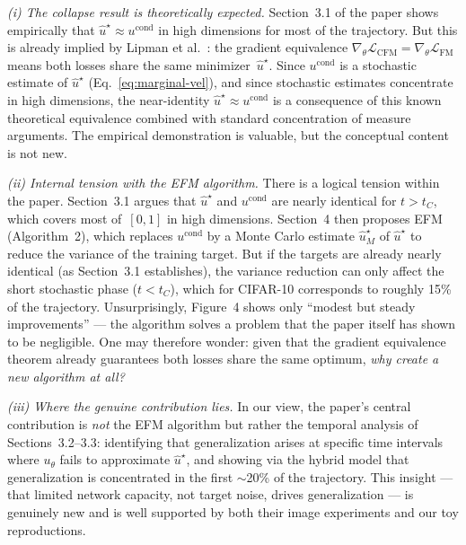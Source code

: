 \documentclass[10pt,a4paper]{article}
\theoremstyle{definition}
\newcommand{\cL}{\mathcal{L}}
\begin{document}
\emph{(i) The collapse result is theoretically expected.}
Section~3.1 of the paper shows empirically that $\hat{u}^\star \approx u^{\mathrm{cond}}$ in high dimensions for most of the trajectory.
But this is already implied by Lipman et al.~\cite[Thm.~2]{lipman2023flow}: the gradient equivalence $\nabla_\theta \cL_{\mathrm{CFM}} = \nabla_\theta \cL_{\mathrm{FM}}$ means both losses share the same minimizer~$\hat{u}^\star$.
Since $u^{\mathrm{cond}}$ is a stochastic estimate of $\hat{u}^\star$ (Eq.~\ref{eq:marginal-vel}), and since stochastic estimates concentrate in high dimensions, the near-identity $\hat{u}^\star \approx u^{\mathrm{cond}}$ is a consequence of this known theoretical equivalence combined with standard concentration of measure arguments.
The empirical demonstration is valuable, but the conceptual content is not new.

\emph{(ii) Internal tension with the EFM algorithm.}
There is a logical tension within the paper.
Section~3.1 argues that $\hat{u}^\star$ and $u^{\mathrm{cond}}$ are nearly identical for $t > t_C$, which covers most of~$[0,1]$ in high dimensions.
Section~4 then proposes EFM (Algorithm~2), which replaces $u^{\mathrm{cond}}$ by a Monte Carlo estimate $\hat{u}^\star_M$ of $\hat{u}^\star$ to reduce the variance of the training target.
But if the targets are already nearly identical (as Section~3.1 establishes), the variance reduction can only affect the short stochastic phase ($t < t_C$), which for CIFAR-10 corresponds to roughly 15\% of the trajectory.
Unsurprisingly, Figure~4 shows only ``modest but steady improvements'' --- the algorithm solves a problem that the paper itself has shown to be negligible.
One may therefore wonder: given that the gradient equivalence theorem already guarantees both losses share the same optimum, \emph{why create a new algorithm at all?}

\emph{(iii) Where the genuine contribution lies.}
In our view, the paper's central contribution is \emph{not} the EFM algorithm but rather the temporal analysis of Sections~3.2--3.3: identifying that generalization arises at specific time intervals where $u_\theta$ fails to approximate $\hat{u}^\star$, and showing via the hybrid model that generalization is concentrated in the first ${\sim}$20\% of the trajectory.
This insight --- that limited network capacity, not target noise, drives generalization --- is genuinely new and is well supported by both their image experiments and our toy reproductions.

\end{document}
